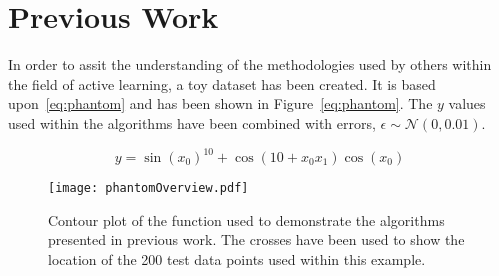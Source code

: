 
\chapter{Previous Work}
\label{ch:2}

\graphicspath{{Chapter2/Figs/Vector/}{Chapter2/Figs/Raster/}}







In order to assit the understanding of the methodologies used by others within the field of active learning, a toy dataset has been created. It is based upon~\ref{eq:phantom} and has been shown in Figure~\ref{eq:phantom}. The $y$ values used within the algorithms have been combined with errors, $\epsilon{}\sim{}\mathcal{N}(0, 0.01)$.

\begin{equation}
  y = \sin{(x_0)}^{10} + \cos{(10 + x_0 x_1)}\cos{(x_0)}
  \label{eq:phantom}
\end{equation}

\begin{figure}[h]
  \begin{center}
    \texttt{[image: phantomOverview.pdf]}
    \caption[Example Dataset for Representation of Ideas]{Contour plot of the function used to demonstrate the algorithms presented in previous work. The crosses have been used to show the location of the 200 test data points used within this example.}
    \label{fig:phantom}
  \end{center}
\end{figure}


